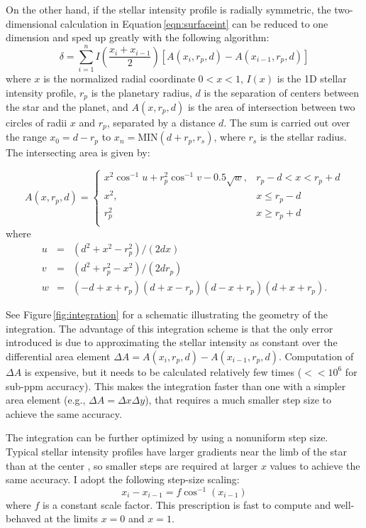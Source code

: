 \documentclass[12pt,preprint]{aastex}
\begin{document}
On the other hand, if the stellar intensity profile is radially symmetric, the two-dimensional calculation in Equation\,\ref{eqn:surfaceint} can be reduced to one dimension and sped up greatly with the following algorithm: 
\begin{equation}
\delta = \sum_{i=1}^{n} I\left(\frac{x_i+x_{i-1}}{2}\right) \left[A(x_{i}, r_p, d) - A(x_{i-1}, r_p, d)\right]
\end{equation}
where $x$ is the normalized radial coordinate $0 < x < 1$, $I(x)$ is the 1D stellar intensity profile, $r_p$ is the planetary radius, $d$ is the separation of centers between the star and the planet, and $A(x, r_p, d)$ is the area of intersection between two circles of radii $x$ and $r_p$, separated by a distance $d$.  The sum is carried out over the range $x_0 = d - r_p$ to $x_n = \textrm{MIN}(d + r_p, r_s)$, where $r_s$ is the stellar radius.  The intersecting area is given by:

\begin{equation}
A(x, r_p, d) = 
\begin{cases}
x^2\cos^{-1}{u} + r_p^2\cos^{-1}{v} - 0.5\sqrt{w}, & r_p -d < x < r_p + d\\
x^2, & x \le r_p - d\\
r_p^2 & x \ge r_p +d \\
\end{cases}
\end{equation}
where
\begin{eqnarray}
u &=& (d^2+x^2-r_p^2)/(2dx)\\
v &=& (d^2 + r_p^2 -x^2)/(2dr_p) \\
w &=& (-d+x+r_p)(d+x-r_p)(d-x+r_p)(d+x+r_p).
\end{eqnarray}

See Figure\,\ref{fig:integration} for a schematic illustrating the geometry of the integration.  The advantage of this integration scheme is that the only error introduced is due to approximating the stellar intensity as constant over the differential area element $\Delta A = A(x_i, r_p, d) - A(x_{i-1}, r_p, d)$.  Computation of $\Delta A$ is expensive, but it needs to be calculated relatively few times ($<<10^{6}$ for sub-ppm accuracy). This makes the integration faster than one with a simpler area element (e.g., $\Delta A = \Delta x \Delta y$), that requires a much smaller step size to achieve the same accuracy.

The integration can be further optimized by using a nonuniform step size.  Typical stellar intensity profiles have larger gradients near the limb of the star than at the center \citep[e.g.][]{claret00}, so smaller steps are required at larger $x$ values to achieve the same accuracy.  I adopt the following step-size scaling: 
$$
x_i - x_{i-1}  = f\cos^{-1}\left(x_{i-1}\right)
$$  
where $f$ is a constant scale factor. This prescription is fast to compute and well-behaved at the limits $x=0$ and $x=1$.
\end{document}

